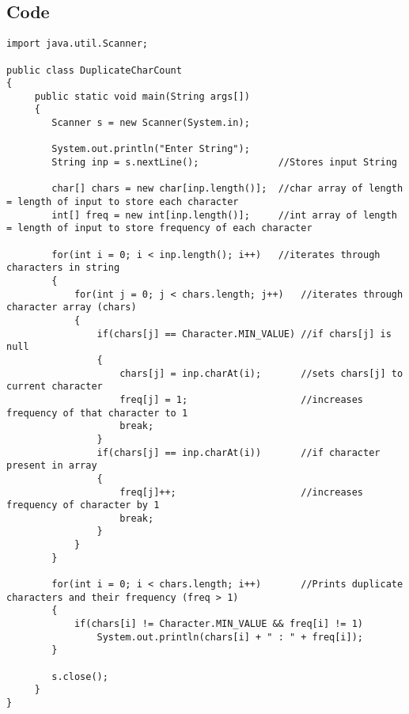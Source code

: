 \documentclass[ProgramminAssignment.tex]{subfiles}
\begin{document}
\subsection{Code}
\begin{lstlisting}
import java.util.Scanner;

public class DuplicateCharCount
{
	 public static void main(String args[])
	 {
		Scanner s = new Scanner(System.in);
		
		System.out.println("Enter String");
		String inp = s.nextLine();				//Stores input String
		
		char[] chars = new char[inp.length()];	//char array of length = length of input to store each character
		int[] freq = new int[inp.length()];		//int array of length = length of input to store frequency of each character
		
		for(int i = 0; i < inp.length(); i++)	//iterates through characters in string
		{
			for(int j = 0; j < chars.length; j++)	//iterates through character array (chars)
			{
				if(chars[j] == Character.MIN_VALUE)	//if chars[j] is null
				{
					chars[j] = inp.charAt(i);		//sets chars[j] to current character
					freq[j] = 1;					//increases frequency of that character to 1
					break;
				}
				if(chars[j] == inp.charAt(i))		//if character present in array
				{
					freq[j]++;						//increases frequency of character by 1
					break;
				}
			}
		}
		
		for(int i = 0; i < chars.length; i++)		//Prints duplicate characters and their frequency (freq > 1)
		{
			if(chars[i] != Character.MIN_VALUE && freq[i] != 1)
				System.out.println(chars[i] + " : " + freq[i]);
		}
		
		s.close();
	 }
}

\end{lstlisting}
\end{document}
